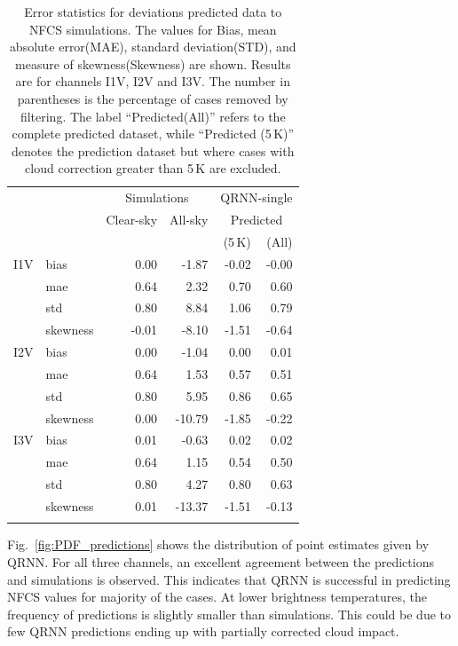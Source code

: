 \documentclass[amt, manuscript]{copernicus}
\begin{document}
\begin{table}[t]
	\caption{ Error statistics for deviations predicted data to NFCS simulations. 
		The values for Bias, mean absolute error(MAE), standard deviation(STD), and measure of skewness(Skewness) are shown. Results are for channels I1V, I2V and I3V. The number in parentheses is the percentage of cases removed by filtering. The label ``Predicted(All)'' refers to the complete predicted dataset, while ``Predicted (5\,K)'' denotes the prediction dataset but where cases with cloud correction greater than 5\,K are excluded.}
	\label{tab:error_statistics_ici}
	\begin{tabular}{llrr|rr}
		\tophline
		&&\multicolumn{2}{c|}{Simulations}& \multicolumn{2}{c}{QRNN-single} \\
		\cline{3-6}
		&&   Clear-sky &   All-sky &  \multicolumn{2}{c}{Predicted}  \\
		&&			   &			&	(5\,K) & (All) \\
		\middlehline
		
		I1V&  bias     &  0.00 & -1.87 & -0.02 & -0.00  \\
		&mae      &  0.64 &  2.32 &  0.70 &  0.60   \\
		&std      &  0.80 &  8.84 &  1.06 &  0.79   \\
		&skewness & -0.01 & -8.10 & -1.51 & -0.64  \\
		\middlehline
		I2V & bias     & 0.00 &  -1.04 &  0.00 &  0.01  \\
		&mae      & 0.64 &   1.53 &  0.57 &  0.51 \\
		&std      & 0.80 &   5.95 &  0.86 &  0.65 \\
		&skewness & 0.00 & -10.79 & -1.85 & -0.22  \\
		\middlehline	
		I3V & bias     & 0.01 &  -0.63 &  0.02 &  0.02  \\
		&mae      & 0.64 &   1.15 &  0.54 &  0.50  \\
		&std      & 0.80 &   4.27 &  0.80 &  0.63  \\
		&skewness & 0.01 & -13.37 & -1.51 & -0.13  \\
		\bottomhline
	\end{tabular}
	\belowtable{} %
\end{table}

Fig.~\ref{fig:PDF_predictions} shows the distribution of point estimates given by QRNN. For all three channels, an excellent agreement between the predictions and simulations is observed. This indicates that QRNN is successful in predicting NFCS values for majority of the cases. At lower brightness temperatures, the frequency of predictions is slightly smaller than simulations. This could be due to few QRNN predictions ending up with partially corrected cloud impact. 
\end{document}
